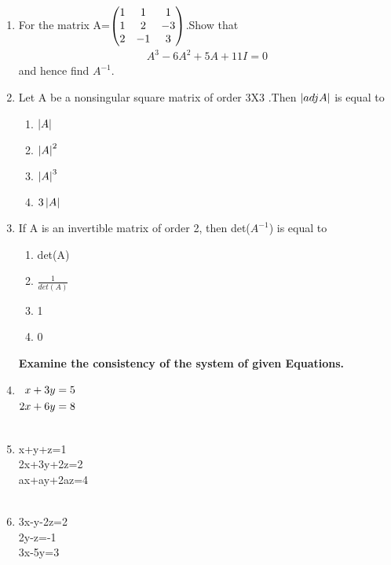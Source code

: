 \documentclass[journal,12pt,twocolumn]{IEEEtran}
\renewcommand\thesection{\arabic{section}}
\begin{document}
\begin{enumerate}[label=\thesection.\arabic*.,ref=\thesection.\theenumi]
\item For the matrix A=$\begin{pmatrix} 1&1&1 \\ 1&2&-3 \\ 2&-1&3\end{pmatrix}$.Show that \begin{align}
    A^3-6A^2+5A+11I=0\label{eq:det/49/1}
\end{align} and hence find $A^{-1}$.
\solution 
%
\item Let A be a nonsingular square matrix of order 3X3 .Then $\left\vert adjA\right\vert$ is equal to 
\begin{enumerate}
\item $\left\vert A\right\vert$
\item $\left\vert A\right\vert^2$
\item $\left\vert A\right\vert^3$
\item $3\left\vert A\right\vert$
\end{enumerate}
\item If A is an invertible matrix of order 2, then det($A^{-1}$) is equal to 
\begin{enumerate}
\item det(A)
\item $\frac{1}{det(A)}$
\item 1
\item 0
\end{enumerate}
\textbf{Examine the consistency of the system of given Equations.}
\item $\begin{alignedat}[t]{2}
x+3y&=5 
\\
2x+6y&=8 
\end{alignedat}$\\
\\
\solution 
%
\item x+y+z=1\\ 2x+3y+2z=2\\ax+ay+2az=4\\
\\
\solution 
%
\item 3x-y-2z=2 \\ 2y-z=-1 \\ 3x-5y=3\\

\end{enumerate}
\end{document}
